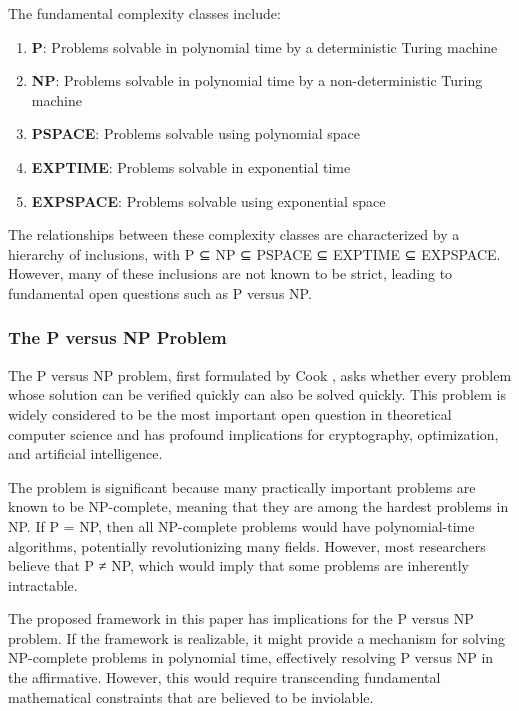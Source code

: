 \documentclass[12pt,a4paper]{article}
\theoremstyle{definition}
\begin{document}
{The fundamental complexity classes include:

\begin{enumerate}
\item \textbf{P}: Problems solvable in polynomial time by a deterministic Turing machine
\item \textbf{NP}: Problems solvable in polynomial time by a non-deterministic Turing machine
\item \textbf{PSPACE}: Problems solvable using polynomial space
\item \textbf{EXPTIME}: Problems solvable in exponential time
\item \textbf{EXPSPACE}: Problems solvable using exponential space
\end{enumerate}

The relationships between these complexity classes are characterized by a hierarchy of inclusions, with P ⊆ NP ⊆ PSPACE ⊆ EXPTIME ⊆ EXPSPACE. However, many of these inclusions are not known to be strict, leading to fundamental open questions such as P versus NP.

\subsubsection{The P versus NP Problem}

The P versus NP problem, first formulated by Cook \cite{cook1971complexity}, asks whether every problem whose solution can be verified quickly can also be solved quickly. This problem is widely considered to be the most important open question in theoretical computer science and has profound implications for cryptography, optimization, and artificial intelligence.

The problem is significant because many practically important problems are known to be NP-complete, meaning that they are among the hardest problems in NP. If P = NP, then all NP-complete problems would have polynomial-time algorithms, potentially revolutionizing many fields. However, most researchers believe that P ≠ NP, which would imply that some problems are inherently intractable.

The proposed framework in this paper has implications for the P versus NP problem. If the framework is realizable, it might provide a mechanism for solving NP-complete problems in polynomial time, effectively resolving P versus NP in the affirmative. However, this would require transcending fundamental mathematical constraints that are believed to be inviolable.

}
\end{document}
